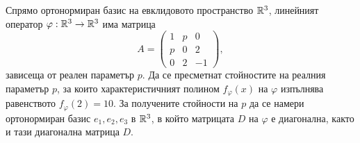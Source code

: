\documentclass[numbers=endperiod, DIV=15, bibliography=totocnumbered]{scrartcl}
\begin{document}
\begin{exercise}
  Спрямо ортонормиран базис на евклидовото пространство $\mathbb{R}^3$, линейният оператор $\varphi: \mathbb{R}^3 \to \mathbb{R}^3$ има матрица
  \begin{displaymath}
    A = \begin{pmatrix}
      1 & p & 0 \\
      p & 0 & 2 \\
      0 & 2 & -1
    \end{pmatrix},
  \end{displaymath}
  зависеща от реален параметър $p$. Да се пресметнат стойностите на реалния параметър $p$, за които характеристичният полином $f_\varphi(x)$ на $\varphi$ изпълнява равенството $f_\varphi(2) = 10$. За получените стойности на $p$ да се намери ортонормиран базис $e_1, e_2, e_3$ в $\mathbb{R}^3$, в който матрицата $D$ на $\varphi$ е диагонална, както и тази диагонална матрица $D$.
\end{exercise}
\end{document}
